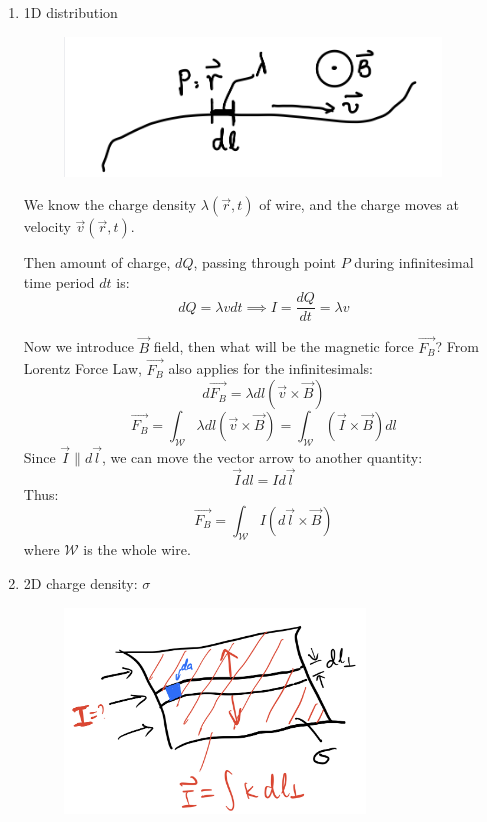 \documentclass[12pt,a4paper,twoside]{article}
\begin{document}
    \begin{enumerate}
        \item 1D distribution
        
        \begin{figure}[t]
            \centering
            \includegraphics[width = 10cm]{250-Revision/current-1d.jpeg}
        \end{figure}
        
        We know the charge density $\lambda (\overrightarrow{r},t)$ of wire, and the charge moves at velocity $\overrightarrow{v}(\overrightarrow{r}, t)$.
        
        Then amount of charge, $dQ$, passing through point $P$ during infinitesimal time period $dt$ is:
        \[dQ=\lambda vdt\implies \boxed{I=\frac{dQ}{dt}=\lambda v}\]
        
        Now we introduce $\overrightarrow{B}$ field, then what will be the magnetic force $\overrightarrow{F_B}$? From Lorentz Force Law, $\overrightarrow{F_B}$ also applies for the infinitesimals:
        \[d\overrightarrow{F_B}=\lambda dl(\overrightarrow{v}\times \overrightarrow{B})\]
        \[\overrightarrow{F_B}=\int_{\mathcal{W}}\lambda dl(\overrightarrow{v}\times \overrightarrow{B})=\int_{\mathcal{W}}(\overrightarrow{I}\times \overrightarrow{B})dl\]
        Since $\overrightarrow{I}\parallel d\overrightarrow{l}$, we can move the vector arrow to another quantity:
        \[\overrightarrow{I}dl=Id\overrightarrow{l}\]
        Thus:
        \begin{equation}
            \boxed{\overrightarrow{F_B}=\int_{\mathcal{W}}I(d\overrightarrow{l}\times \overrightarrow{B})}
        \end{equation}
        where $\mathcal{W}$ is the whole wire.
        
        \item 2D charge density: \(\sigma\)
        \begin{figure}[ht]
            \centering
            \includegraphics[width=8cm]{250-Revision/current-2d.jpeg}
        \end{figure}
        

\end{enumerate}
\end{document}
